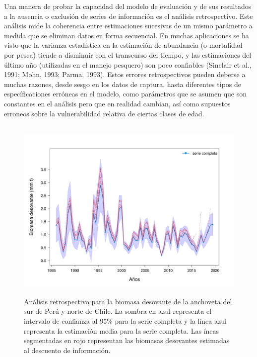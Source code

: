 \documentclass[letter,11pt]{article}
\begin{document}
Una manera de probar la capacidad del modelo de evaluaci\'on y de sus resultados a la
ausencia o exclusi\'on de series de informaci\'on es el an\'alisis retrospectivo. Este
an\'alisis mide la coherencia entre estimaciones sucesivas de un mismo par\'ametro a
medida que se eliminan datos en forma secuencial. En muchas aplicaciones se ha visto
que la varianza estad\'istica en la estimaci\'on de abundancia (o mortalidad por pesca)
tiende a disminuir con el transcurso del tiempo, y las estimaciones del \'ultimo a\~{n}o
(utilizadas en el manejo pesquero) son poco confiables (Sinclair et al., 1991; Mohn, 1993;
Parma, 1993). Estos errores retrospectivos pueden deberse a muchas razones, desde sesgo
en los datos de captura, hasta diferentes tipos de espec\'ificaciones  err\'oneas en el
modelo, como par\'ametros que se asumen que son constantes en el an\'alisis pero que en
realidad cambian, así como supuestos erroneos sobre la vulnerabilidad relativa de ciertas
clases de edad.\\


\vspace{0.5cm}
\begin{figure}[htb!]
 \centering
 \includegraphics[width=15cm,height=9cm]{fig/figura07.pdf}
 \caption{An\'alisis retrospectivo para la biomasa desovante de la anchoveta del sur de Per\'u y norte de Chile. La sombra en azul representa el intervalo de confianza al 95\% para la serie
 completa y la l\'inea azul representa la estimaci\'on media para la serie completa.
 Las \'ineas segmentadas en rojo representan las biomasas desovantes estimadas al descuento de 
 informaci\'on.}
 \label{Fig07}
\end{figure}
\vspace{0.5cm}
\end{document}
